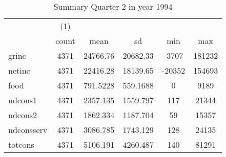 \begin{table}[htbp]\centering
\def\sym#1{\ifmmode^{#1}\else\(^{#1}\)\fi}
\caption{Summary Quarter 2 in year 1994 \label{sum\_Q2\_y1994}}
\begin{tabular}{l*{1}{ccccc}}
\hline\hline
            &\multicolumn{1}{c}{(1)}&            &            &            &            \\
            &       count&        mean&          sd&         min&         max\\
\hline
grinc       &        4371&    24766.76&    20682.33&       -3707&      181232\\
netinc      &        4371&    22416.28&    18139.65&      -20352&      154693\\
food        &        4371&    791.5228&    559.1688&           0&        9189\\
ndcons1     &        4371&    2357.135&    1559.797&         117&       21344\\
ndcons2     &        4371&    1862.334&    1187.704&          59&       15357\\
ndconsserv  &        4371&    3086.785&    1743.129&         128&       24135\\
totcons     &        4371&    5106.191&    4260.487&         140&       81291\\
\hline\hline
\end{tabular}
\end{table}
